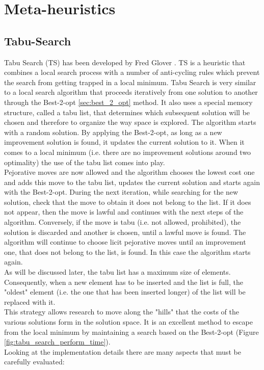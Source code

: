 \chapter{Meta-heuristics}

\section{Tabu-Search}
Tabu Search (TS) has been developed by Fred Glover \cite{Glover1998}. TS is a heuristic that combines a local search process with a number of anti-cycling rules which prevent the search from getting trapped in a local minimum. Tabu Search is very similar to a local search algorithm that proceeds iteratively from one solution to another through the Best-2-opt \ref{sec:best_2_opt} method. It also uses a special memory structure, called a tabu list, that determines which subsequent solution will be chosen and therefore to organize the way space is explored. The algorithm starts with a random solution. By applying the Best-2-opt, as long as a new improvement solution is found, it updates the current solution to it. When it comes to a local minimum (i.e. there are no improvement solutions around two optimality) the use of the tabu list comes into play.\\
Pejorative moves are now allowed and the algorithm chooses the lowest cost one and adds this move to the tabu list, updates the current solution and starts again with the Best-2-opt.
During the next iteration, while searching for the new solution, check that the move to obtain it does not belong to the list. If it does not appear, then the move is lawful and continues with the next steps of the algorithm. Conversely, if the move is tabu (i.e. not allowed, prohibited), the solution is discarded and another is chosen, until a lawful move is found. The algorithm will continue to choose licit pejorative moves until an improvement one, that does not belong to the list, is found. In this case the algorithm starts again.\\
As will be discussed later, the tabu list has a maximum size of elements. Consequently, when a new element has to be inserted and the list is full, the "oldest" element (i.e. the one that has been inserted longer) of the list will be replaced with it.\\
This strategy allows research to move along the "hills" that the costs of the various solutions form in the solution space. It is an excellent method to escape from the local minimum by maintaining a search based on the Best-2-opt (Figure \ref{fig:tabu_search_perform_time}).\\
Looking at the implementation details there are many aspects that must be carefully evaluated:

